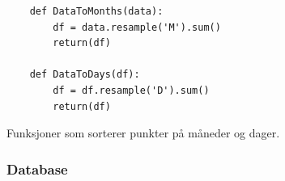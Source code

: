 \begin{code}
\begin{verbatim}
    def DataToMonths(data):
        df = data.resample('M').sum()
        return(df)
    
    def DataToDays(df):
        df = df.resample('D').sum()
        return(df)
\end{verbatim}
\caption{Funksjoner som sorterer punkter på måneder og dager.}
\label{code:dfSortEx1}
\end{code}

\subsubsection{Database}

